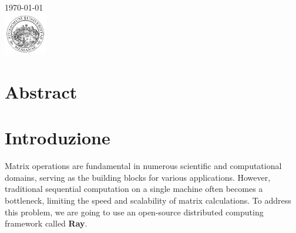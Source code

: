 \begin{titlepage}


{\large \today}\\[2cm] %


\includegraphics[width=70px, keepaspectratio]{unime.png}\\[1cm] %
 

\vfill %

\end{titlepage}

\tableofcontents
\pagebreak

\section{Abstract}

\section{Introduzione}
Matrix operations are fundamental in numerous scientific and computational domains, serving as the building blocks for various applications. However, traditional sequential computation on a single machine often becomes a bottleneck, limiting the speed and scalability of matrix calculations. To address this problem, we are going to use an open-source distributed computing framework called \textbf{Ray}.

